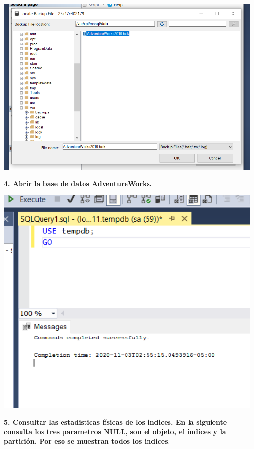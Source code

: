 \documentclass{article}
\begin{document}
    \begin{center}
		\includegraphics[width=15cm]{./images/7} 
	\end{center}
\newpage
\textbf{4. Abrir la base de datos AdventureWorks.}

    \begin{center}
		\includegraphics[width=15cm]{./images/11} 
	\end{center}
	

\newpage
\textbf{5.  Consultar las estadisticas físicas de los indices. En la siguiente consulta los tres parametros NULL, son el objeto, el indices y la partición. Por eso se muestran todos los indices.}
\end{document}

